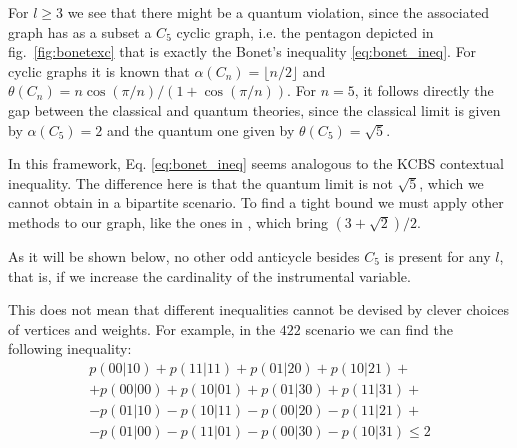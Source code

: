 \documentclass[letterpaper]{article}
\newcommand{\avg}[1]{\langle#1\rangle}
\begin{document}
For $l\ge3$ we see that there might be a quantum violation, since the associated graph has as a subset a $C_5$ cyclic graph, i.e. the pentagon depicted in
fig.~\ref{fig:bonetexc} that is exactly the Bonet's inequality \eqref{eq:bonet_ineq}.
For cyclic graphs it is known that $\alpha(C_n) = \lfloor n/2 \rfloor$ and
$\theta(C_n) = n\cos(\pi/n)/(1+\cos(\pi/n))$. For $n=5$, it follows directly the
gap between the classical and quantum theories, since the classical limit is
given by $\alpha(C_5)=2$ and the quantum one given by $\theta(C_5)=\sqrt{5}$.

In this framework, Eq. \eqref{eq:bonet_ineq} seems analogous to the KCBS contextual
inequality\cite{kcbs2008}.
The difference here is that the quantum limit is not $\sqrt{5}$, which we cannot
obtain in a bipartite scenario.
To find a tight bound we must apply other methods to our graph, like the ones in
\cite{rabelo2014}, which bring $(3+\sqrt{2})/2$.

As it will be shown below, no other odd anticycle besides
$C_5$ is present for any $l$, that is, if we increase the cardinality of the
instrumental variable. 

This does not mean that different inequalities cannot be devised by clever
choices of vertices and weights. 
For example, in the $422$ scenario  we can find the following inequality:
\begin{multline}
    p(00|10) + p(11|11) + p(01|20) + p(10|21) +\\
    + p(00|00) + p(10|01) + p(01|30) + p(11|31) +\\
    - p(01|10) - p(10|11) - p(00|20) - p(11|21) +\\
    - p(01|00) - p(11|01) - p(00|30) - p(10|31)
    \le 2
    \label{eq:422_ineq}
\end{multline}
\end{document}
